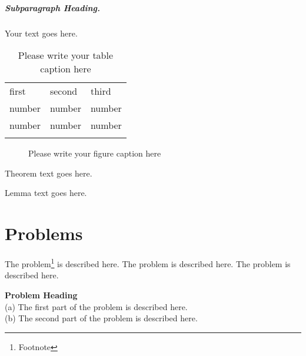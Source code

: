 \subparagraph{Subparagraph Heading.} Your text goes here.%
%
%
%
\begin{table}
\centering
\caption{Please write your table caption here}
\label{tab:1}       %
%
%
\begin{tabular}{lll}
\hline\noalign{\smallskip}
first & second & third  \\
\noalign{\smallskip}\hline\noalign{\smallskip}
number & number & number \\
number & number & number \\
\noalign{\smallskip}\hline
\end{tabular}
\end{table}
%
%
%
\begin{figure}
\centering
%
%
\caption{Please write your figure caption here}
\label{fig:1}       %
\end{figure}
%
%
\begin{theorem}
Theorem text goes here.
\end{theorem}
%
%
\begin{lemma}
Lemma text goes here.
\end{lemma}
%
%
\section*{Problems}
%
\begin{prob}
\label{prob1}
The problem\footnote{Footnote} is described here. The
problem is described here. The problem is described here.
\end{prob}

\begin{prob}
\label{prob2}
\textbf{Problem Heading}\\
(a) The first part of the problem is described here.\\
(b) The second part of the problem is described here.
\end{prob}



%
